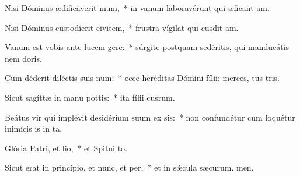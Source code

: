 \item Nisi Dóminus ædificáverit mum,~* in vanum laboravérunt qui æficant am.
\item Nisi Dóminus custodíerit civitem,~* frustra vígilat qui cusdit am.
\item Vanum est vobis ante lucem gere:~* súrgite postquam sedéritis, qui manducátis nem doris.
\item Cum déderit diléctis suis num:~* ecce heréditas Dómini fílii: merces, tus tris.
\item Sicut sagíttæ in manu pottis:~* ita fílii cusrum.
\item Beátus vir qui implévit desidérium suum ex sis:~* non confundétur cum loquétur inimícis is in ta.
\item Glória Patri, et lio,~* et Spitui to.
\item Sicut erat in princípio, et nunc, et per,~* et in sǽcula sæcurum. men.
